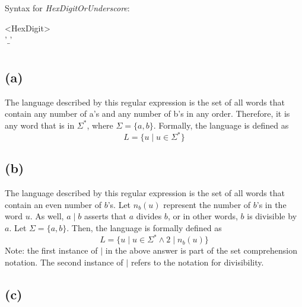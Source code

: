 \documentclass[12pt]{article}
\begin{document}
\bigskip

Syntax for \textit{HexDigitOrUnderscore}:

\begin{syntdiag}
	\begin{stack}
		<HexDigit>\\
		'$\_$'
	\end{stack}
\end{syntdiag}

\bigskip

\section{}

\subsection*{(a)}

The language described by this regular expression is the set of all words that contain any number of a's and any number of b's in any order. Therefore, it is any word that is in $ \Sigma^* $, where $ \Sigma = \{a, b\}$. Formally, the language is defined as $$ \boxed{L = \{ u \mid u \in \Sigma^* \} } $$

\subsection*{(b)}

The language described by this regular expression is the set of all words that contain an even number of $b$'s. Let $ n_b(u) $ represent the number of $b$'s in the word $ u $. As well, $ a \mid b $ asserts that $a$ divides $b$, or in other words, $b$ is divisible by $a$. Let $ \Sigma = \{a, b\}$. Then, the language is formally defined as $$ \boxed{L = \{ u \mid u \in \Sigma^* \wedge 2 \mid n_b(u) \}}$$ Note: the first instance of $\mid$ in the above answer is part of the set comprehension notation. The second instance of $\mid$ refers to the notation for divisibility. 

\subsection*{(c)}
\end{document}

